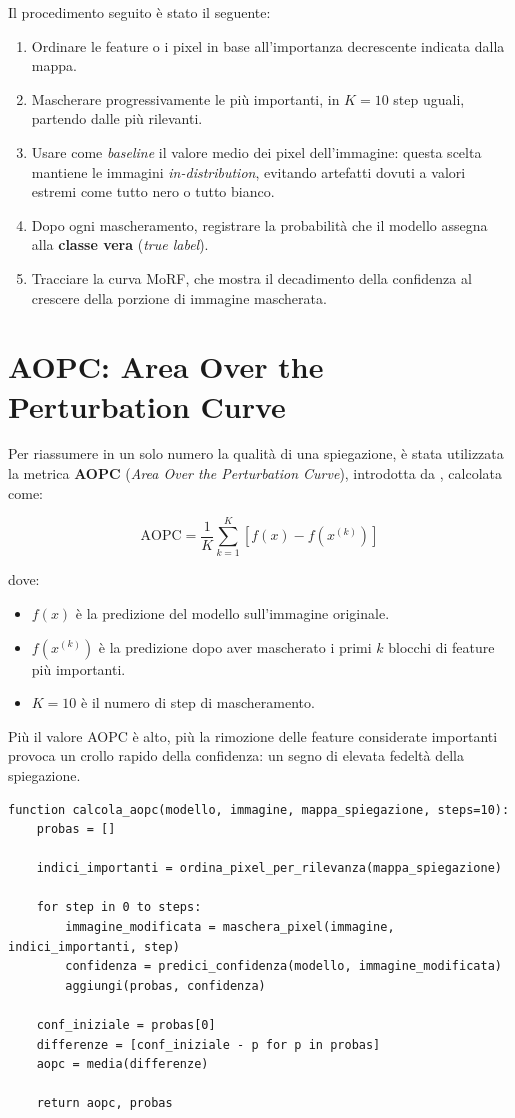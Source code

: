 \documentclass[12pt,a4paper,oneside]{report}
\numberwithin{figure}{chapter}
\numberwithin{table}{chapter}
\begin{document}
Il procedimento seguito è stato il seguente:
\begin{enumerate}
      \item Ordinare le feature o i pixel in base all’importanza decrescente indicata dalla
            mappa.
      \item Mascherare progressivamente le più importanti, in $K=10$ step uguali, partendo
            dalle più rilevanti.
      \item Usare come \emph{baseline} il valore medio dei pixel dell’immagine: questa
            scelta mantiene le immagini \emph{in-distribution}, evitando artefatti dovuti a
            valori estremi come tutto nero o tutto bianco.
      \item Dopo ogni mascheramento, registrare la probabilità che il modello assegna alla
            \textbf{classe vera} (\textit{true label}).
      \item Tracciare la curva MoRF, che mostra il decadimento della confidenza al crescere
            della porzione di immagine mascherata.
\end{enumerate}

\section{AOPC: Area Over the Perturbation Curve}
Per riassumere in un solo numero la qualità di una spiegazione, è stata
utilizzata la metrica \textbf{AOPC} (\emph{Area Over the Perturbation Curve}),
introdotta da \citet{samek2016evaluating}, calcolata come:

\[
      \mathrm{AOPC} = \frac{1}{K} \sum_{k=1}^K \left[ f(x) - f(x^{(k)}) \right]
\]

dove:
\begin{itemize}
      \item $f(x)$ è la predizione del modello sull’immagine originale.
      \item $f(x^{(k)})$ è la predizione dopo aver mascherato i primi $k$ blocchi di feature più importanti.
      \item $K=10$ è il numero di step di mascheramento.
\end{itemize}

Più il valore AOPC è alto, più la rimozione delle feature considerate
importanti provoca un crollo rapido della confidenza: un segno di elevata
fedeltà della spiegazione.

\begin{lstlisting}[caption={Procedura MoRF e calcolo AOPC}, label={lst:morf_aopc}]
function calcola_aopc(modello, immagine, mappa_spiegazione, steps=10):
    probas = []
    
    indici_importanti = ordina_pixel_per_rilevanza(mappa_spiegazione)
    
    for step in 0 to steps:
        immagine_modificata = maschera_pixel(immagine, indici_importanti, step)
        confidenza = predici_confidenza(modello, immagine_modificata)
        aggiungi(probas, confidenza)
    
    conf_iniziale = probas[0]
    differenze = [conf_iniziale - p for p in probas]
    aopc = media(differenze)
    
    return aopc, probas
\end{lstlisting}
\end{document}
